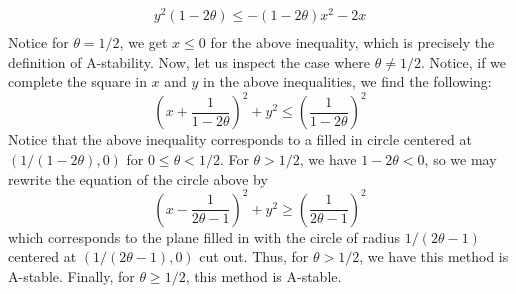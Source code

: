 \documentclass{article}
\begin{document}
\begin{itemize}
\begin{align*}
        y^2(1-2\theta) \leq -(1-2\theta)x^2 - 2x \\
    \end{align*}
    Notice for $\theta = 1/2$, we get $x \leq 0$ for the above inequality, which is precisely the definition of A-stability. Now, let us inspect the case where $\theta \neq 1/2$. Notice, if we complete the square in $x$ and $y$ in the above inequalities, we find the following:
    \[\left(x + \frac{1}{1 - 2\theta}\right)^2 + y^2 \leq \left(\frac{1}{1 - 2\theta}\right)^2\]
    Notice that the above inequality corresponds to a filled in circle centered at $(1/(1-2\theta), 0)$ for $0 \leq \theta < 1/2$. For $\theta > 1/2$, we have $1 - 2\theta < 0$, so we may rewrite the equation of the circle above by
    \[\left(x - \frac{1}{2\theta-1} \right)^2 + y^2 \geq \left(\frac{1}{2\theta - 1}\right)^2\]
    which corresponds to the plane filled in with the circle of radius $1/(2\theta - 1)$ centered at $(1/(2\theta - 1), 0)$ cut out. Thus, for $\theta > 1/2$, we have this method is A-stable.
    \newline
    Finally, for $\theta \geq 1/2$, this method is A-stable.


\end{itemize}
\end{document}
